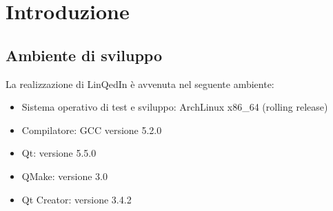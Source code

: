 \section{Introduzione}

\subsection{Ambiente di sviluppo}

La realizzazione di LinQedIn \`e avvenuta nel seguente ambiente:
\begin{itemize}

\item Sistema operativo di test e sviluppo: ArchLinux x86\_64 (rolling release)
\item Compilatore: GCC versione 5.2.0
\item Qt: versione 5.5.0
\item QMake: versione 3.0
\item Qt Creator: versione 3.4.2

\end{itemize}

 
